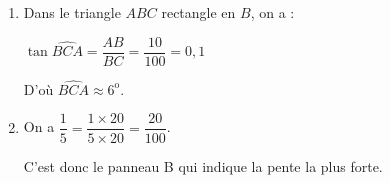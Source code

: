
\medskip

\begin{enumerate}
  \item Dans le triangle $ABC$ rectangle en $B$, on a :
  
  $\tan \widehat{BCA} = \dfrac{AB}{BC} = \dfrac{10}{100} = 0,1$
  
  D'où $\widehat{BCA} \approx 6^\mathrm{o}$.
  \item On a $\dfrac{1}{5} = \dfrac{1 \times 20}{5 \times 20} = \dfrac{20}{100}$.
  
  C'est donc le panneau B qui indique la pente la plus forte.
\end{enumerate}
